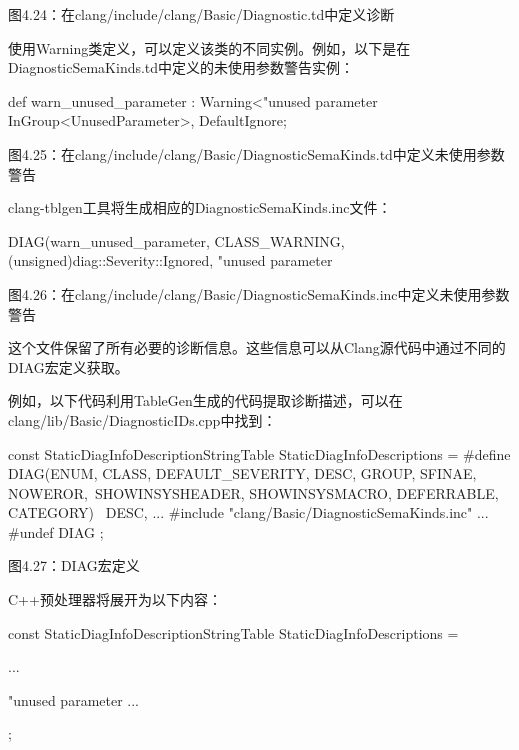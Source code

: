 \begin{center}
图4.24：在clang/include/clang/Basic/Diagnostic.td中定义诊断
\end{center}

使用Warning类定义，可以定义该类的不同实例。例如，以下是在DiagnosticSemaKinds.td中定义的未使用参数警告实例：

\begin{shell}
def warn_unused_parameter : Warning<"unused parameter %
  InGroup<UnusedParameter>, DefaultIgnore;
\end{shell}

\begin{center}
图4.25：在clang/include/clang/Basic/DiagnosticSemaKinds.td中定义未使用参数警告
\end{center}

clang-tblgen工具将生成相应的DiagnosticSemaKinds.inc文件：

\begin{shell}
DIAG(warn_unused_parameter, CLASS_WARNING, (unsigned)diag::Severity::Ignored, "unused parameter %
\end{shell}

\begin{center}
图4.26：在clang/include/clang/Basic/DiagnosticSemaKinds.inc中定义未使用参数警告
\end{center}

这个文件保留了所有必要的诊断信息。这些信息可以从Clang源代码中通过不同的DIAG宏定义获取。

例如，以下代码利用TableGen生成的代码提取诊断描述，可以在clang/lib/Basic/DiagnosticIDs.cpp中找到：

\begin{cpp}
const StaticDiagInfoDescriptionStringTable StaticDiagInfoDescriptions = {
  #define DIAG(ENUM, CLASS, DEFAULT_SEVERITY, DESC, GROUP, SFINAE, NOWEROR,\
    SHOWINSYSHEADER, SHOWINSYSMACRO, DEFERRABLE, CATEGORY)    \
    DESC,
    ...
    #include "clang/Basic/DiagnosticSemaKinds.inc"
    ...
    #undef DIAG
};
\end{cpp}

\begin{center}
图4.27：DIAG宏定义
\end{center}

C++预处理器将展开为以下内容：

\begin{cpp}
const StaticDiagInfoDescriptionStringTable StaticDiagInfoDescriptions = {
    ...

    "unused parameter %
    ...
};
\end{cpp}


